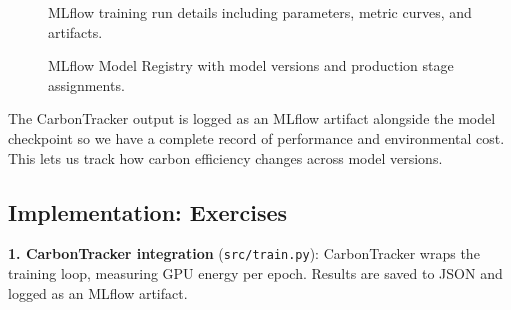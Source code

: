 \documentclass[10pt,twocolumn,letterpaper]{article}
\begin{document}
\begin{figure}[h]
    \centering
    \caption{MLflow training run details including parameters, metric curves, and artifacts.}
    \label{fig:mlflow-monitoring}
\end{figure}

\begin{figure}[h]
    \centering
    \caption{MLflow Model Registry with model versions and production stage assignments.}
    \label{fig:mlflow-registry}
\end{figure}

The CarbonTracker output is logged as an MLflow artifact alongside the model checkpoint so we have a complete record of performance and environmental cost. This lets us track how carbon efficiency changes across model versions.

\subsection{Implementation: Exercises}

\textbf{1. CarbonTracker integration} (\texttt{src/train.py}): CarbonTracker wraps the training loop, measuring GPU energy per epoch. Results are saved to JSON and logged as an MLflow artifact.
\end{document}
